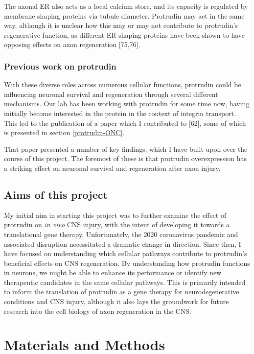 \documentclass[
  12pt,
  a4paper,
]{book}
\begin{document}
The axonal ER also acts as a local calcium store, and its capacity is regulated by membrane shaping proteins via tubule diameter. Protrudin may act in the same way, although it is unclear how this may or may not contribute to protrudin's regenerative function, as different ER-shaping proteins have been shown to have opposing effects on axon regeneration {[}75,76{]}.

\subsection{Previous work on protrudin}\label{previous-work-on-protrudin}

With these diverse roles across numerous cellular functions, protrudin could be influencing neuronal survival and regeneration through several different mechanisms. Our lab has been working with protrudin for some time now, having initially become interested in the protein in the context of integrin transport. This led to the publication of a paper which I contributed to {[}62{]}, some of which is presented in section \ref{protrudin-ONC}.

That paper presented a number of key findings, which I have built upon over the course of this project. The foremost of these is that protrudin overexpression has a striking effect on neuronal survival and regeneration after axon injury.

\section{Aims of this project}\label{intro-aims}

My initial aim in starting this project was to further examine the effect of protrudin on \emph{in vivo} CNS injury, with the intent of developing it towards a translational gene therapy. Unfortunately, the 2020 coronavirus pandemic and associated disruption necessitated a dramatic change in direction. Since then, I have focused on understanding which cellular pathways contribute to protrudin's beneficial effects on CNS regeneration. By understanding how protrudin functions in neurons, we might be able to enhance its performance or identify new therapeutic candidates in the same cellular pathways. This is primarily intended to inform the translation of protrudin as a gene therapy for neurodegenerative conditions and CNS injury, although it also lays the groundwork for future research into the cell biology of axon regeneration in the CNS.

\chapter*{Materials and Methods}\label{METHODS}
\end{document}
